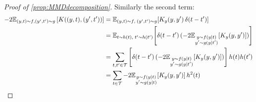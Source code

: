 \begin{proof}[Proof of \cref{prop:MMDdecomposition}]
Similarly the second term:
\begin{equation}
\begin{aligned}
    -2\E_{(\statevar,t)\sim f, (\statevar',t')\sim g}\left[K((\statevar,t), (\statevar',t'))\right] &= \mathbb{E}_{(\statevar,t)\sim f,\; (\statevar',t')\sim g}\!\left[K_{\statevar}(\statevar,\statevar')\,\delta(t-t')\right]\\
    &=\mathbb{E}_{t\sim h(t),\; t'\sim h(t')}\!\left[\delta(t-t')\,(-2\mathbb{E}_{\substack{\statevar\sim f(\statevar\mid t) \\ \statevar'\sim g(\statevar\mid t')}}\!\left[K_{\statevar}(\statevar,\statevar')\right])\right]\\
    &=\sum_{t,t'\in \timerange}\left[\delta(t-t')\,(-2\mathbb{E}_{\substack{\statevar\sim f(\statevar\mid t) \\ \statevar'\sim g(\statevar\mid t')}}\!\left[K_{\statevar}(\statevar,\statevar')\right])\right]h(t)h(t')\\
    &=\sum_{t\in \timerange} -2\mathbb{E}_{\substack{\statevar\sim f(\statevar\mid t) \\ \statevar'\sim g(\statevar\mid t)}}\!\left[K_{\statevar}(\statevar,\statevar')\right]h^2(t)
\end{aligned}
\end{equation}


\end{proof}
